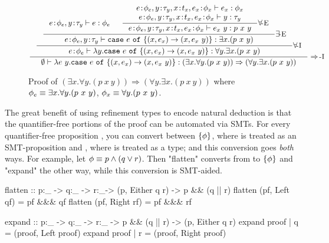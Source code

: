 \begin{figure}
$$
\inference{
	\inference{
		\inference{
			\bind{e}{\formulap},
			\bind{y}{\typ_y}
			\vdash
			 e
			 :
	        \formulap &&
	        \inference{
	        \bind{e}{\formulap},
			\bind{y}{\typ_y},
			\bind{x}{\type_x},
			\bind{e_x}{\formulax}
			\vdash
			 e_x
			 :
	         \formulax
	         \\
	        \bind{e}{\formulap},
			\bind{y}{\typ_y},
			\bind{x}{\type_x},
			\bind{e_x}{\formulax}
			\vdash
			 y
			 :
	         \typ_y
	        }{
	        \bind{e}{\formulap},
			\bind{y}{\typ_y},
			\bind{x}{\type_x},
			\bind{e_x}{\formulax}
			\vdash
			 e_x\ y
			 :
	         p\ x\ y
	        }\forallElim
		}{
			\bind{e}{\formulap},
			\bind{y}{\typ_y}
			\vdash
			\texttt{case}\ e\ \texttt{of}\ \{
                                (x,e_x) \rightarrow (x, e_x\ y)
                        \}
                        :
	        \exists x. (p\ x\ y)
		}\existsElim
	}{
	\bind{e}{\formulap}
	\vdash
	\lambda y. \texttt{case}\ e\ \texttt{of}\ \{
    (x,e_x) \rightarrow (x, e_x\ y)
    \}
    :
	\forall y. \exists x. (p\ x\ y)
	}\forallIntro
}
{
\emptyset
\vdash
\lambda e\ y. \texttt{case}\ e\ \texttt{of}\ \{
    (x,e_x) \rightarrow (x, e_x\ y)
\}
:
{(\exists x. \forall y. (p\ x\ y)) \Rightarrow (\forall y. \exists x. (p\ x\ y))}
}
\impIntro
$$
\caption{Proof of $(\exists x. \forall y. (p\ x\ y)) \Rightarrow (\forall y. \exists x. (p\ x\ y))$
where
$\phi_e \equiv \exists x. \forall y. (p\ x\ y)
$,
$
\phi_x \equiv \forall y. (p\ x\ y)
$.
}
\figrule
\label{fig:ex:ch}
\end{figure}

The great benefit of using refinement types
to encode natural deduction is that the quantifier-free
portions of the proof can be automated via SMTs.
%
For every quantifier-free proposition \formula,
you can convert between $\{\phi\}$,
where \formula is treated as an SMT-proposition
and \formula, where \formula is treated as a
type; and this conversion goes \emph{both} ways.
%
For example, let $\phi \equiv p \land (q \lor r)$.
%
Then "flatten" converts from \formula to
$\{\phi\}$ and "expand" the other way,
while this conversion is SMT-aided.
%
\begin{mcode}
    flatten :: p:_ -> q:_ -> r:_-> ({p}, Either {q} {r}) -> {p && (q || r)}
    flatten (pf, Left  qf) = pf &&& qf
    flatten (pf, Right rf) = pf &&& rf

    expand :: p:_ -> q:_ -> r:_ -> {p && (q || r)} -> ({p}, Either {q} {r})
    expand proof | q = (proof, Left  proof)
    expand proof | r = (proof, Right proof)
\end{mcode}

